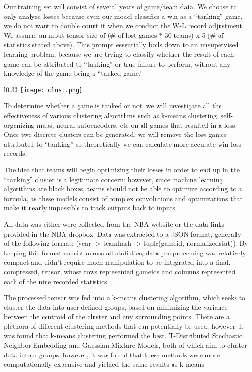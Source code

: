 \documentclass{article}
\begin{document}
 Our training set will consist of several years of game/team data. We choose to only analyze losses because even our model classifies a win as a “tanking” game, we do not want to double count it when we conduct the W-L record adjustment. We assume an input tensor size of  ($\#$ of lost  games * 30 teams) x 5 ($\#$ of statistics stated above). This prompt essentially boils down to an unsupervised learning problem, because we are trying to classify whether the result of each game can be attributed to “tanking” or true failure to perform, without any knowledge of the game being a “tanked game.” 
\bigbreak
\begin{wrapfigure}{l}{0.33\textwidth}
    \centering
    \texttt{[image: clust.png]}
    
\end{wrapfigure}
To determine whether a game is tanked or not, we will investigate all the effectiveness of various clustering algorithms such as k-means clustering, self-organizing maps, neural autoencoders, etc on all games that resulted in a loss. Once two discrete clusters can be generated, we will remove the lost games attributed to “tanking” so theoretically we can calculate more accurate win-loss records. 

\bigbreak
The idea that teams will begin optimizing their losses in order to end up in the “tanking” cluster is a legitimate concern; however, since machine learning algorithms are black boxes, teams should not be able to optimize according to a formula, as these models consist of complex convolutions and optimizations that make it nearly impossible to track outputs back to inputs.

\newpage

 All data was either were collected from the NBA website or the data links provided in the NBA dropbox. Data was extracted to a JSON format, generally of the following format: (year -> teamhash -> tuple(gameid, normalizedstat)). By keeping this format consist across all statistics, data pre-processing was relatively compact and didn't require much manipulation to be integrated into a final, compressed, tensor, whose rows represented gameids and columns represented each of the nine recorded statistics.

 The processed tensor was fed into a k-means clustering algorithm, which seeks to cluster the data into user-defined groups, based on minimizing the variance between the centroid of the cluster and any surrounding points. There are a plethora of different clustering methods that can potentially be used; however, it was found that k-means clustering performed the best. T-Distributed Stochastic Neighbor Embedding and Gaussian Mixture Models, both of which aim to cluster data into n groups; however, it was found that these methods were more computationally expensive and yielded the same results as k-means.
\end{document}
